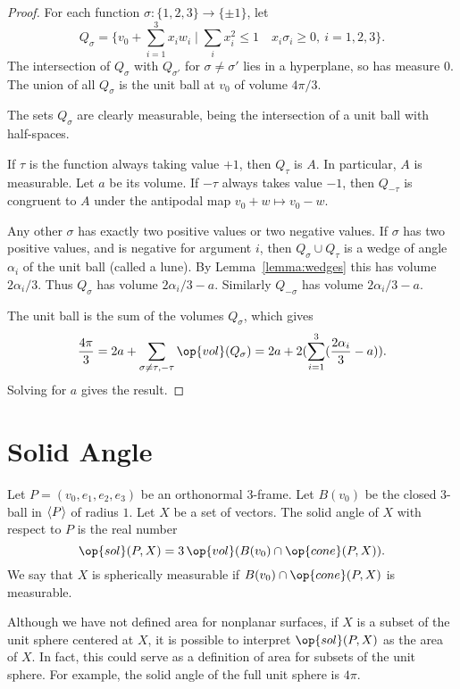 \begin{proof} For each function $\sigma:\{1,2,3\}\to\{\pm 1\}$, let
    $$
    Q_\sigma =
    \{ v_0 + \sum_{i=1}^3 x_i w_i \mid \sum_i x_i^2\le 1\quad
    x_i\sigma_i \ge 0,\ i=1,2,3\}.
    $$
The intersection of $Q_\sigma$ with $Q_{\sigma'}$ for
$\sigma\ne\sigma'$ lies in a hyperplane, so has measure $0$.  The
union of all $Q_\sigma$ is the unit ball at $v_0$ of volume
$4\pi/3$.

The sets $Q_\sigma$ are clearly measurable, being the intersection
of a unit ball with half-spaces.

If $\tau$ is the function always taking value $+1$, then $Q_{\tau}$
is $A$.  In particular, $A$ is measurable. Let $a$ be its volume.
If $-\tau$ always takes value $-1$, then $Q_{-\tau}$ is congruent to
$A$ under the antipodal map $v_0 + w\mapsto v_0-w$.

Any other $\sigma$ has exactly two positive values or two negative
values. If $\sigma$ has two positive values, and is negative for
argument $i$,  then $Q_\sigma\cup Q_{\tau}$ is a wedge of angle
$\alpha_i$ of the unit ball (called a lune). By
Lemma~\ref{lemma:wedges} this has volume $2\alpha_i/3$. Thus
$Q_\sigma$ has volume $2\alpha_i/3 - a$. Similarly $Q_{-\sigma}$ has
volume $2\alpha_i/3 - a$.

The unit ball is the sum of the volumes $Q_\sigma$, which gives
    $$\frac{4\pi}3 = 2a + \sum_{\sigma\ne\tau,-\tau}
    \op{vol}(Q_\sigma) =
    2 a + 2 (\sum_{i=1}^3 (\frac{2\alpha_i}{3} - a)).$$
Solving for $a$ gives the result.
\end{proof}

\section{Solid Angle}

\begin{definition}
Let $P=(v_0,e_1,e_2,e_3)$ be an orthonormal $3$-frame.    Let
$B(v_0)$ be the closed $3$-ball in ${\langle P\rangle}$ of radius $1$. Let
$X$ be a set of vectors.  The solid angle of $X$ with respect to $P$
is the real number
    $$\op{sol}(P,X) = 3\,\op{vol}(B(v_0)\cap\op{cone}(P,X)).$$  We
    say that $X$ is spherically measurable if
    $B(v_0)\cap\op{cone}(P,X)$ is measurable.
\end{definition}

\begin{remark*} Although we have not defined area for nonplanar
surfaces, if $X$ is a subset of the unit sphere centered at $X$, it
is possible to interpret $\op{sol}(P,X)$ as the area of $X$.  In
fact, this could serve as a definition of area for subsets of the
unit sphere.  For example, the solid angle of the full unit sphere
is $4\pi$.
\end{remark*}

